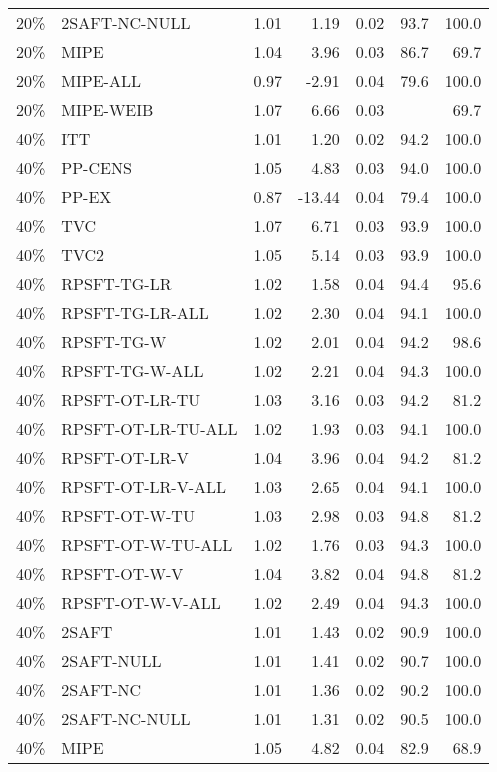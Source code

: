 \begin{table}[ht]
{\begin{tabular}{llrrrrr}
  20\% & 2SAFT-NC-NULL & 1.01 & 1.19 & 0.02 & 93.7 & 100.0 \\ 
  20\% & MIPE & 1.04 & 3.96 & 0.03 & 86.7 & 69.7 \\ 
  20\% & MIPE-ALL & 0.97 & -2.91 & 0.04 & 79.6 & 100.0 \\ 
  20\% & MIPE-WEIB & 1.07 & 6.66 & 0.03 &  & 69.7 \\ 
   \hline
40\% & ITT & 1.01 & 1.20 & 0.02 & 94.2 & 100.0 \\ 
  40\% & PP-CENS & 1.05 & 4.83 & 0.03 & 94.0 & 100.0 \\ 
  40\% & PP-EX & 0.87 & -13.44 & 0.04 & 79.4 & 100.0 \\ 
  40\% & TVC & 1.07 & 6.71 & 0.03 & 93.9 & 100.0 \\ 
  40\% & TVC2 & 1.05 & 5.14 & 0.03 & 93.9 & 100.0 \\ 
   \hline
40\% & RPSFT-TG-LR & 1.02 & 1.58 & 0.04 & 94.4 & 95.6 \\ 
  40\% & RPSFT-TG-LR-ALL & 1.02 & 2.30 & 0.04 & 94.1 & 100.0 \\ 
  40\% & RPSFT-TG-W & 1.02 & 2.01 & 0.04 & 94.2 & 98.6 \\ 
  40\% & RPSFT-TG-W-ALL & 1.02 & 2.21 & 0.04 & 94.3 & 100.0 \\ 
  40\% & RPSFT-OT-LR-TU & 1.03 & 3.16 & 0.03 & 94.2 & 81.2 \\ 
  40\% & RPSFT-OT-LR-TU-ALL & 1.02 & 1.93 & 0.03 & 94.1 & 100.0 \\ 
  40\% & RPSFT-OT-LR-V & 1.04 & 3.96 & 0.04 & 94.2 & 81.2 \\ 
  40\% & RPSFT-OT-LR-V-ALL & 1.03 & 2.65 & 0.04 & 94.1 & 100.0 \\ 
   \hline
40\% & RPSFT-OT-W-TU & 1.03 & 2.98 & 0.03 & 94.8 & 81.2 \\ 
  40\% & RPSFT-OT-W-TU-ALL & 1.02 & 1.76 & 0.03 & 94.3 & 100.0 \\ 
  40\% & RPSFT-OT-W-V & 1.04 & 3.82 & 0.04 & 94.8 & 81.2 \\ 
  40\% & RPSFT-OT-W-V-ALL & 1.02 & 2.49 & 0.04 & 94.3 & 100.0 \\ 
   \hline
40\% & 2SAFT & 1.01 & 1.43 & 0.02 & 90.9 & 100.0 \\ 
  40\% & 2SAFT-NULL & 1.01 & 1.41 & 0.02 & 90.7 & 100.0 \\ 
  40\% & 2SAFT-NC & 1.01 & 1.36 & 0.02 & 90.2 & 100.0 \\ 
  40\% & 2SAFT-NC-NULL & 1.01 & 1.31 & 0.02 & 90.5 & 100.0 \\ 
  40\% & MIPE & 1.05 & 4.82 & 0.04 & 82.9 & 68.9 \\ 

\end{tabular}}
\end{table}
